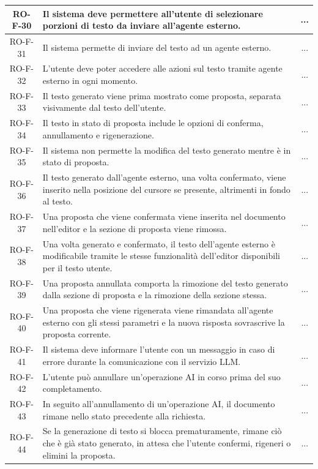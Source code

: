 \documentclass[11pt,a4paper]{article}
\begin{document}
\begin{longtable}{|c|p{11cm}|c|}
\hline
RO-F-30 & Il sistema deve permettere all'utente di selezionare porzioni di testo da inviare all'agente esterno. & ... \\
\hline
RO-F-31 & Il sistema permette di inviare del testo ad un agente esterno. & ... \\
\hline
RO-F-32 & L'utente deve poter accedere alle azioni sul testo tramite agente esterno in ogni momento. & ... \\
\hline
RO-F-33 & Il testo generato viene prima mostrato come proposta, separata visivamente dal testo dell'utente. & ... \\
\hline
RO-F-34 & Il testo in stato di proposta include le opzioni di conferma, annullamento e rigenerazione. & ... \\
\hline
RO-F-35 & Il sistema non permette la modifica del testo generato mentre è in stato di proposta. & ... \\
\hline
RO-F-36 & Il testo generato dall'agente esterno, una volta confermato, viene inserito nella posizione del cursore se presente, altrimenti in fondo al testo. & ... \\
\hline
RO-F-37 & Una proposta che viene confermata viene inserita nel documento nell'editor e la sezione di proposta viene rimossa. & ... \\
\hline
RO-F-38 & Una volta generato e confermato, il testo dell'agente esterno è modificabile tramite le stesse funzionalità dell'editor disponibili per il testo utente. & ... \\
\hline
RO-F-39 & Una proposta annullata comporta la rimozione del testo generato dalla sezione di proposta e la rimozione della sezione stessa. & ... \\
\hline
RO-F-40 & Una proposta che viene rigenerata viene rimandata all'agente esterno con gli stessi parametri e la nuova risposta sovrascrive la proposta corrente. & ... \\
\hline
RO-F-41 & Il sistema deve informare l'utente con un messaggio in caso di errore durante la comunicazione con il servizio LLM. & ... \\
\hline
RO-F-42 & L'utente può annullare un'operazione AI in corso prima del suo completamento. & ... \\
\hline
RO-F-43 & In seguito all'annullamento di un'operazione AI, il documento rimane nello stato precedente alla richiesta. & ... \\
\hline
RO-F-44 & Se la generazione di testo si blocca prematuramente, rimane ciò che è già stato generato, in attesa che l'utente confermi, rigeneri o elimini la proposta. & ... \\

\end{longtable}
\end{document}
